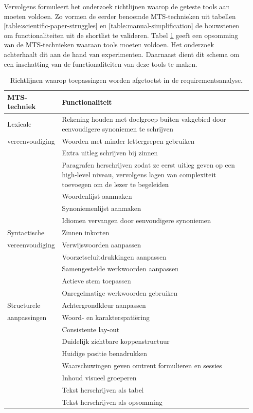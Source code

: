 Vervolgens formuleert het onderzoek richtlijnen waarop de geteste tools aan moeten voldoen. Zo vormen de eerder benoemde MTS-technieken uit tabellen \ref{table:scientific-paper-struggles} en \ref{table:manual-simplification} de bouwstenen om functionaliteiten uit de shortlist te valideren. Tabel \ref{table:criteria-requirementsanalysis} geeft een opsomming van de MTS-technieken waaraan tools moeten voldoen. Het onderzoek achterhaalt dit aan de hand van experimenten. Daarnaast dient dit schema om een inschatting van de functionaliteiten van deze tools te maken.

\begin{center}
	\begin{table}[H]
		\begin{tabular}{ | m{4cm} | m{11cm} | } 
			\hline
			\textbf{MTS-techniek} & \textbf{Functionaliteit} \\
			\hline
			Lexicale & Rekening houden met doelgroep buiten vakgebied door eenvoudigere synoniemen te schrijven \\
			vereenvoudiging & Woorden met minder lettergrepen gebruiken \\
			& Extra uitleg schrijven bij zinnen \\
			& Paragrafen herschrijven zodat ze eerst uitleg geven op een high-level niveau, vervolgens lagen van complexiteit toevoegen om de lezer te begeleiden \\
			& Woordenlijst aanmaken \\
			& Synoniemenlijst aanmaken \\
			& Idiomen vervangen door eenvoudigere synoniemen \\
			\hline
			Syntactische & Zinnen inkorten \\
			vereenvoudiging & Verwijswoorden aanpassen \\
			& Voorzetseluitdrukkingen aanpassen \\
			& Samengestelde werkwoorden aanpassen \\
			& Actieve stem toepassen \\
			& Onregelmatige werkwoorden gebruiken \\
			\hline
			Structurele & Achtergrondkleur aanpassen \\
			aanpassingen & Woord- en karakterspatiëring \\
			& Consistente lay-out \\
			& Duidelijk zichtbare koppenstructuur \\
			& Huidige positie benadrukken \\
			& Waarschuwingen geven omtrent formulieren en sessies \\
			& Inhoud visueel groeperen \\
			& Tekst herschrijven als tabel \\
			& Tekst herschrijven als opsomming \\
			\hline
		\end{tabular}
		\caption{Richtlijnen waarop toepassingen worden afgetoetst in de requirementsanalyse.}
		\label{table:criteria-requirementsanalysis}	
	\end{table}
\end{center}

